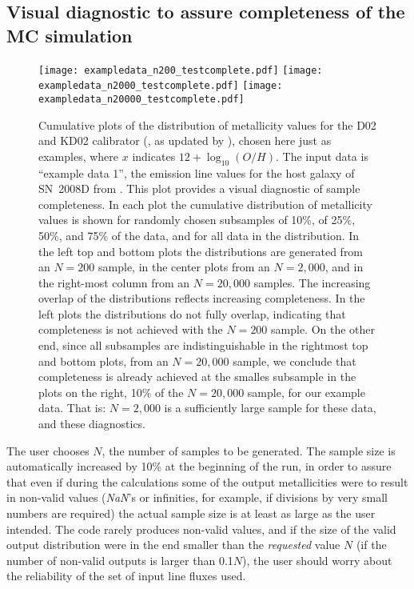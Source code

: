 \documentclass{emulateapj} \usepackage{amsmath} \usepackage{float}
\newcommand{\oxabinline}{\ensuremath{12 + \log_{10}(O/H)}}
\begin{document}
\subsection{Visual diagnostic to assure completeness of the MC simulation}\label{sec:completeness}

\begin{figure*}[!ht]
\centerline{
  \texttt{[image: exampledata\_n200\_testcomplete.pdf]}
  \texttt{[image: exampledata\_n2000\_testcomplete.pdf]}
  \texttt{[image: exampledata\_n20000\_testcomplete.pdf]}}
\caption{Cumulative plots of the distribution of metallicity values
  for the D02 \citep{denicolo02} and KD02 calibrator
  (\citealt{kewley02}, as updated by \citealt{kewley08}), chosen here
  just as examples, where $x$ indicates \oxabinline. The input data is
  ``example data 1'', the emission line values for the host galaxy of
  SN~2008D from \citet{modjaz11}. This plot provides a visual
  diagnostic of sample completeness. In each plot the cumulative
  distribution of metallicity values is shown for randomly chosen
  subsamples of 10\%, of 25\%, 50\%, and 75\% of the data, and for all
  data in the distribution. In the left top and bottom plots the
  distributions are generated from an $N=200$ sample, in the center
  plots from an $N=2,000$, and in the right-most column from an
  $N=20,000$ samples. The increasing overlap of the distributions
  reflects increasing completeness. In the left plots the
  distributions do not fully overlap, indicating that completeness is
  not achieved with the $N=200$ sample. On the other end, since all
  subsamples are indistinguishable in the rightmost top and bottom
  plots, from an $N=20,000$ sample, we conclude that completeness is
  already achieved at the smalles subsample in the plots on the right,
  10\% of the $N=20,000$ sample, for our example data. That is:
  $N=2,000$ is a sufficiently large sample for these data, and these
  diagnostics.}
 \label{cd}
\end{figure*}

The user chooses $N$, the number of samples to be generated. The
sample size is automatically increased by 10\% at the beginning of the
run, in order to assure that even if during the calculations some of
the output metallicities were to result in non-valid values
(\emph{NaN}'s or infinities, for example, if divisions by very small
numbers are required) the actual sample size is at least as large as
the user intended.  The code rarely produces non-valid values, and if
the size of the valid output distribution were in the end smaller than
the \emph{requested} value $N$ (if the number of non-valid
outputs is larger than 0.1$N$), the user should worry
about the reliability of the set of input line fluxes used.
\end{document}
